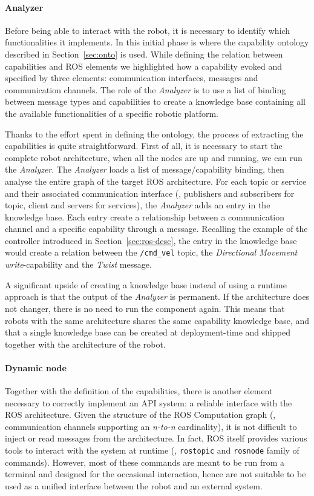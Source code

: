 \paragraph{Analyzer} Before being able to interact with the robot, it is necessary to identify which functionalities it implements. In this initial phase is where the capability ontology described in Section~\ref{sec:onto} is used. While defining the relation between capabilities and ROS elements we highlighted how a capability evoked and specified by three elements: communication interfaces, messages and communication channels. The role of the \textit{Analyzer} is to use a list of binding between message types and capabilities to create a knowledge base containing all the available functionalities of a specific robotic platform.

Thanks to the effort spent in defining the ontology, the process of extracting the capabilities is quite straightforward. First of all, it is necessary to start the complete robot architecture, when all the nodes are up and running, we can run the \textit{Analyzer}. The \textit{Analyzer} loads a list of message/capability binding, then analyse the entire graph of the target ROS architecture. For each topic or service and their associated communication interface (\ie, publishers and subscribers for topic, client and servers for services), the \textit{Analyzer} adds an entry in the knowledge base. Each entry create a relationship between a communication channel and a specific capability through a message. Recalling the example of the controller introduced in Section~\ref{sec:ros-desc}, the entry in the knowledge base would create a relation between the \texttt{/cmd\_vel} topic, the \textit{Directional Movement} \textit{write}-capability and the \textit{Twist} message.

A significant upside of creating a knowledge base instead of using a runtime approach is that the output of the \textit{Analyzer} is permanent. If the architecture does not changer, there is no need to run the component again. This means that robots with the same architecture shares the same capability knowledge base, and that a single knowledge base can be created at deployment-time and shipped together with the architecture of the robot.

\paragraph{Dynamic node} Together with the definition of the capabilities, there is another element necessary to correctly implement an API system: a reliable interface with the ROS architecture. Given the structure of the ROS Computation graph (\ie, communication channels supporting an \textit{n-to-n} cardinality), it is not difficult to inject or read messages from the architecture. In fact, ROS itself provides various tools to interact with the system at runtime (\eg, \texttt{rostopic} and \texttt{rosnode} family of commands). However, most of these commands are meant to be run from a terminal and designed for the occasional interaction, hence are not suitable to be used as a unified interface between the robot and an external system.

